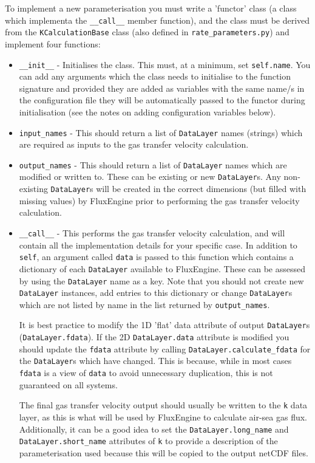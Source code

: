 \documentclass[]{scrartcl}
\begin{document}
To implement a new parameterisation you must write a 'functor' class (a class which implementa the \texttt{\_\_call\_\_} member function), and the class must be derived from the \texttt{KCalculationBase} class (also defined in \texttt{rate\_parameters.py}) and implement four functions:
\begin{itemize}
	\item \texttt{\_\_init\_\_} - Initialises the class. This must, at a minimum, set \texttt{self.name}. You can add any arguments which the class needs to initialise to the function signature and provided they are added as variables with the same name/s in the configuration file they will be automatically passed to the functor during initialisation (see the notes on adding configuration variables below).
	\item \texttt{input\_names} - This should return a list of \texttt{DataLayer} names (strings) which are required as inputs to the gas transfer velocity calculation.
	\item \texttt{output\_names} - This should return a list of \texttt{DataLayer} names which are modified or written to. These can be existing or new \texttt{DataLayer}s. Any non-existing \texttt{DataLayer}s will be created in the correct dimensions (but filled with missing values) by FluxEngine prior to performing the gas transfer velocity calculation.
	\item \texttt{\_\_call\_\_} - This performs the gas transfer velocity calculation, and will contain all the implementation details for your specific case. In addition to \texttt{self}, an argument called \texttt{data} is passed to this function which contains a dictionary of each \texttt{DataLayer} available to FluxEngine. These can be assessed by using the \texttt{DataLayer} name as a key. Note that you should not create new \texttt{DataLayer} instances, add entries to this dictionary or change \texttt{DataLayer}s which are not listed by name in the list returned by \texttt{output\_names}.
	
	It is best practice to modify the 1D 'flat' data attribute of output \texttt{DataLayer}s (\texttt{DataLayer.fdata}). If the 2D \texttt{DataLayer.data} attribute is modified you should update the \texttt{fdata} attribute by calling \texttt{DataLayer.calculate\_fdata} for the \texttt{DataLayer}s which have changed. This is because, while in most cases \texttt{fdata} is a view of \texttt{data} to avoid unnecessary duplication, this is not guaranteed on all systems.
	
	The final gas transfer velocity output should usually be written to the \texttt{k} data layer, as this is what will be used by FluxEngine to calculate air-sea gas flux. Additionally, it can be a good idea to set the \texttt{DataLayer.long\_name} and \texttt{DataLayer.short\_name} attributes of \texttt{k} to provide a description of the parameterisation used because this will be copied to the output netCDF files.
\end{itemize}
\end{document}
